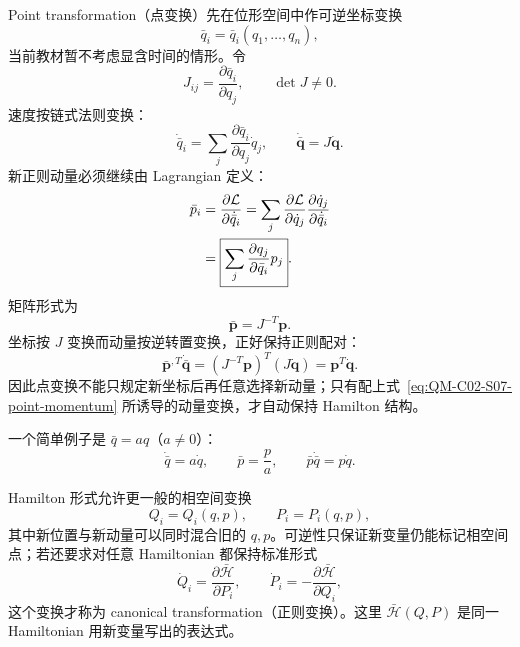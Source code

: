 Point transformation（点变换）先在位形空间中作可逆坐标变换
\begin{equation}
  \bar q_i=\bar q_i(q_1,\ldots,q_n),
  \label{eq:QM-C02-S07-point-transformation}
\end{equation}
当前教材暂不考虑显含时间的情形。令
\[
  J_{ij}=\frac{\partial\bar q_i}{\partial q_j},
  \qquad
  \det J\neq0.
\]
速度按链式法则变换：
\begin{equation}
  \dot{\bar q}_i
  =\sum_j\frac{\partial\bar q_i}{\partial q_j}\dot q_j,
  \qquad
  \dot{\bar{\bm q}}=J\dot{\bm q}.
  \label{eq:QM-C02-S07-point-velocity}
\end{equation}
新正则动量必须继续由 Lagrangian 定义：
\begin{align}
  \bar p_i
  &=\frac{\partial\mathcal L}{\partial\dot{\bar q}_i}
    =\sum_j
      \frac{\partial\mathcal L}{\partial\dot q_j}
      \frac{\partial\dot q_j}{\partial\dot{\bar q}_i} \notag\\
  &=\boxed{
    \sum_j
    \frac{\partial q_j}{\partial\bar q_i}p_j}.
  \label{eq:QM-C02-S07-point-momentum}
\end{align}
矩阵形式为
\begin{equation}
  \boxed{
  \bar{\bm p}=J^{-T}\bm p.}
  \label{eq:QM-C02-S07-covector-transformation}
\end{equation}
坐标按 $J$ 变换而动量按逆转置变换，正好保持正则配对：
\begin{equation}
  \bar{\bm p}^{,T}\dot{\bar{\bm q}}
  =(J^{-T}\bm p)^T(J\dot{\bm q})
  =\bm p^T\dot{\bm q}.
  \label{eq:QM-C02-S07-canonical-pairing}
\end{equation}
因此点变换不能只规定新坐标后再任意选择新动量；只有配上式~\eqref{eq:QM-C02-S07-point-momentum} 所诱导的动量变换，才自动保持 Hamilton 结构。

一个简单例子是 $\bar q=aq$（$a\neq0$）：
\[
  \dot{\bar q}=a\dot q,
  \qquad
  \bar p=\frac pa,
  \qquad
  \bar p\dot{\bar q}=p\dot q.
\]


Hamilton 形式允许更一般的相空间变换
\begin{equation}
  Q_i=Q_i(q,p),
  \qquad
  P_i=P_i(q,p),
  \label{eq:QM-C02-S07-general-transformation}
\end{equation}
其中新位置与新动量可以同时混合旧的 $q,p$。可逆性只保证新变量仍能标记相空间点；若还要求对任意 Hamiltonian 都保持标准形式
\begin{equation}
  \dot Q_i=\frac{\partial\bar{\mathcal H}}{\partial P_i},
  \qquad
  \dot P_i=-\frac{\partial\bar{\mathcal H}}{\partial Q_i},
  \label{eq:QM-C02-S07-new-hamilton-equations}
\end{equation}
这个变换才称为 canonical transformation（正则变换）。这里 $\bar{\mathcal H}(Q,P)$ 是同一 Hamiltonian 用新变量写出的表达式。

